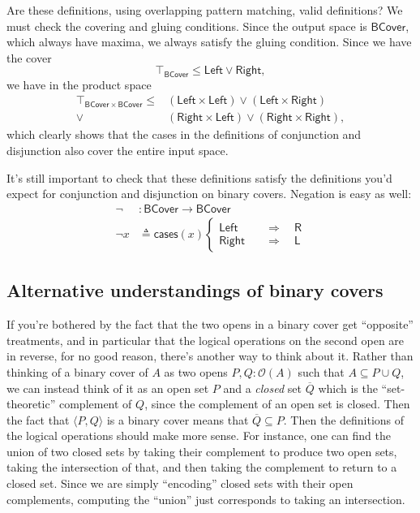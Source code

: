 \documentclass[conference]{IEEEtran}
\newcommand{\Open}[1]{\mathcal{O}({#1})}
\newcommand{\Branch}{\Rightarrow}
\begin{document}
Are these definitions, using overlapping pattern matching, valid definitions? We must check the covering and gluing conditions. Since the output space is $\mathsf{BCover}$, which always have maxima, we always satisfy the gluing condition. Since we have the cover
\[
\top_\mathsf{BCover} \le \mathsf{Left} \vee \mathsf{Right},
\]
we have in the product space
\begin{align*}
\top_{\mathsf{BCover} \times \mathsf{BCover}} \le 
  &(\mathsf{Left} \times \mathsf{Left}) \vee (\mathsf{Left} \times \mathsf{Right})
\\ \vee &(\mathsf{Right} \times \mathsf{Left}) \vee (\mathsf{Right} \times \mathsf{Right}),
\end{align*}
which clearly shows that the cases in the definitions of conjunction and disjunction also cover the entire input space.

It's still important to check that these definitions satisfy the definitions you'd expect for conjunction and disjunction on binary covers. Negation is easy as well:
\begin{align*}
 \neg &: \mathsf{BCover} \to \mathsf{BCover}
\\ \neg x &\triangleq \mathsf{cases}(x)
\begin{cases}
\mathsf{Left}
 \quad &\Branch \quad
 \mathsf{R}
\\
\mathsf{Right}
 \quad &\Branch \quad
 \mathsf{L}
\end{cases}
\end{align*}

\subsection{Alternative understandings of binary covers}

If you're bothered by the fact that the two opens in a binary cover get ``opposite'' treatments, and in particular that the logical operations on the second open are in reverse, for no good reason, there's another way to think about it. Rather than thinking of a binary cover of $A$ as two opens $P, Q : \Open{A}$ such that $A \subseteq P \cup Q$, we can instead think of it as an open set $P$ and a \emph{closed} set $\overline{Q}$ which is the ``set-theoretic'' complement of $Q$, since the complement of an open set is closed. Then the fact that $\langle P, Q \rangle$ is a binary cover means that $\overline{Q} \subseteq P$. Then the definitions of the logical operations should make more sense. For instance, one can find the union of two closed sets by taking their complement to produce two open sets, taking the intersection of that, and then taking the complement to return to a closed set. Since we are simply ``encoding'' closed sets with their open complements, computing the ``union'' just corresponds to taking an intersection.
\end{document}
